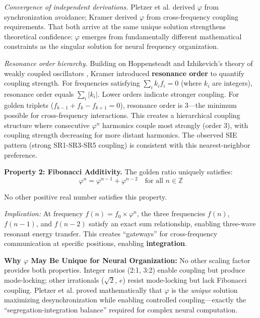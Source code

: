 \documentclass[11pt,a4paper]{article}
\newcommand{\phisym}{\varphi}
\begin{document}
\textit{Convergence of independent derivations.} Pletzer et al. derived $\phisym$ from synchronization avoidance; Kramer derived $\phisym$ from cross-frequency coupling requirements. That both arrive at the same unique solution strengthens theoretical confidence: $\phisym$ emerges from fundamentally different mathematical constraints as the singular solution for neural frequency organization.

\textit{Resonance order hierarchy.} Building on Hoppensteadt and Izhikevich's theory of weakly coupled oscillators \parencite{hoppensteadt1997weakly}, Kramer introduced \textbf{resonance order} to quantify coupling strength. For frequencies satisfying $\sum_i k_i f_i = 0$ (where $k_i$ are integers), resonance order equals $\sum_i |k_i|$. Lower orders indicate stronger coupling. For golden triplets ($f_{k-1} + f_k - f_{k+1} = 0$), resonance order is 3---the minimum possible for cross-frequency interactions. This creates a hierarchical coupling structure where consecutive $\phisym^n$ harmonics couple most strongly (order 3), with coupling strength decreasing for more distant harmonics. The observed SIE pattern (strong SR1-SR3-SR5 coupling) is consistent with this nearest-neighbor preference.

\textbf{Property 2: Fibonacci Additivity.}
The golden ratio uniquely satisfies:
\begin{equation}
\phisym^n = \phisym^{n-1} + \phisym^{n-2} \quad \text{for all } n \in \mathbb{Z}
\end{equation}

No other positive real number satisfies this property.

\textit{Implication:} At frequency $f(n) = f_0 \times \phisym^n$, the three frequencies $f(n)$, $f(n-1)$, and $f(n-2)$ satisfy an exact sum relationship, enabling three-wave resonant energy transfer. This creates ``gateways'' for cross-frequency communication at specific positions, enabling \textbf{integration}.

\begin{keyinsight}
\textbf{Why $\phisym$ May Be Unique for Neural Organization:}
No other scaling factor provides both properties. Integer ratios (2:1, 3:2) enable coupling but produce mode-locking; other irrationals ($\sqrt{2}$, $e$) resist mode-locking but lack Fibonacci coupling. Pletzer et al. \parencite{pletzer2010golden} proved mathematically that $\phisym$ is the \textit{unique} solution maximizing desynchronization while enabling controlled coupling---exactly the ``segregation-integration balance'' required for complex neural computation.
\end{keyinsight}
\end{document}
